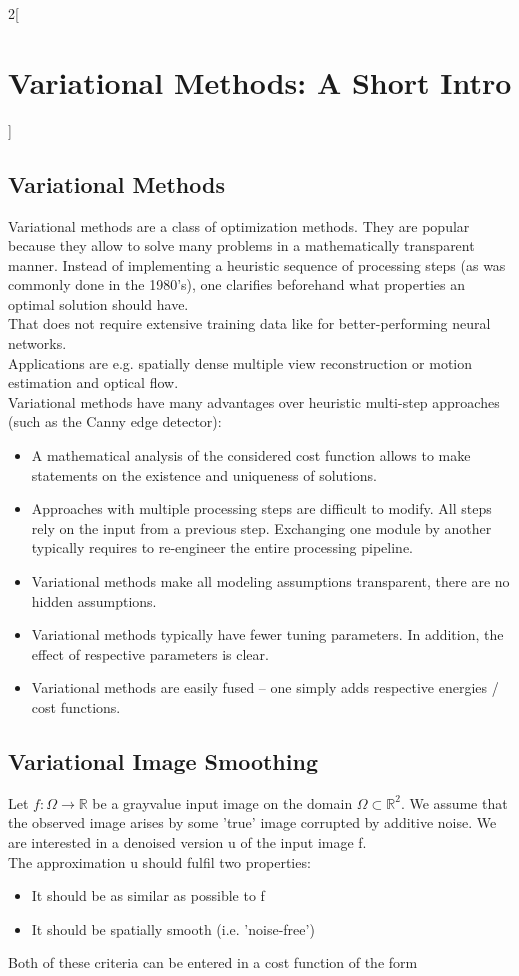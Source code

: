 \documentclass[oneside,fontsize=11pt,paper=a4]{scrartcl}
\begin{document}
\begin{multicols}{2}[\section{Variational Methods: A Short Intro}]
\subsection{Variational Methods}
Variational methods are a class of optimization methods. They are popular because they allow to solve many problems in a mathematically transparent manner. Instead of implementing a heuristic sequence of processing steps (as was commonly done in the 1980's), one clarifies beforehand what properties an optimal solution should have.\\
That does not require extensive training data like for better-performing neural networks.\\
Applications are e.g. spatially dense multiple view reconstruction or motion estimation and optical flow.\\
Variational methods have many advantages over heuristic multi-step approaches (such as the Canny edge detector):
\begin{itemize}
    \item A mathematical analysis of the considered cost function allows to make statements on the existence and uniqueness of solutions.
    \item Approaches with multiple processing steps are difficult to modify. All steps rely on the input from a previous step. Exchanging one module by another typically requires to re-engineer the entire processing pipeline.
    \item Variational methods make all modeling assumptions
    transparent, there are no hidden assumptions.
    \item Variational methods typically have fewer tuning parameters. In addition, the effect of respective parameters is clear.
    \item Variational methods are easily fused – one simply adds respective energies / cost functions.
\end{itemize}

\subsection{Variational Image Smoothing}
Let $f: \Omega \rightarrow \mathbb{R}$ be a grayvalue input image on the domain $\Omega \subset \mathbb{R}^2$. We assume that the observed image arises by some ’true’ image corrupted by additive noise. We are interested in a denoised version u of the input image f. \\
The approximation u should fulfil two properties:
\begin{itemize}
    \item It should be as similar as possible to f
    \item It should be spatially smooth (i.e. ’noise-free’)
\end{itemize}
Both of these criteria can be entered in a cost function of the
form


\end{multicols}
\end{document}
